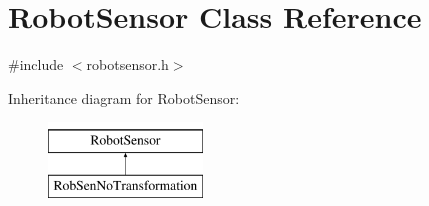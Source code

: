 \hypertarget{classRobotSensor}{}\section{Robot\+Sensor Class Reference}
\label{classRobotSensor}


{\ttfamily \#include $<$robotsensor.\+h$>$}

Inheritance diagram for Robot\+Sensor\+:\begin{figure}[H]
\begin{center}
\leavevmode
\includegraphics[height=2.000000cm]{classRobotSensor}
\end{center}
\end{figure}
